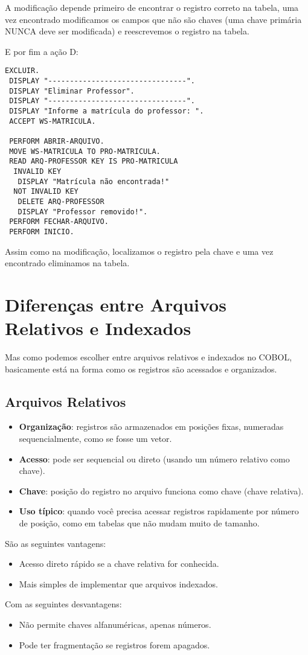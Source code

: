 A modificação depende primeiro de encontrar o registro correto na tabela, uma vez encontrado modificamos os campos que não são chaves (uma chave primária NUNCA deve ser modificada) e reescrevemos o registro na tabela.

E por fim a ação D:
\begin{lstlisting}[]
EXCLUIR.
 DISPLAY "--------------------------------".
 DISPLAY "Eliminar Professor".
 DISPLAY "--------------------------------".
 DISPLAY "Informe a matrícula do professor: ".
 ACCEPT WS-MATRICULA.

 PERFORM ABRIR-ARQUIVO.
 MOVE WS-MATRICULA TO PRO-MATRICULA.
 READ ARQ-PROFESSOR KEY IS PRO-MATRICULA
  INVALID KEY 
   DISPLAY "Matrícula não encontrada!"
  NOT INVALID KEY
   DELETE ARQ-PROFESSOR
   DISPLAY "Professor removido!".
 PERFORM FECHAR-ARQUIVO.
 PERFORM INICIO.
\end{lstlisting}

Assim como na modificação, localizamos o registro pela chave e uma vez encontrado eliminamos na tabela.

\section{Diferenças entre Arquivos Relativos e Indexados}
Mas como podemos escolher entre arquivos relativos e indexados no COBOL, basicamente está na forma como os registros são acessados e organizados.

\subsection{Arquivos Relativos}
\begin{itemize}
	\item \textbf{Organização}: registros são armazenados em posições fixas, numeradas sequencialmente, como se fosse um vetor.
	\item \textbf{Acesso}: pode ser sequencial ou direto (usando um número relativo como chave).
	\item \textbf{Chave}: posição do registro no arquivo funciona como chave (chave relativa).
	\item \textbf{Uso típico}: quando você precisa acessar registros rapidamente por número de posição, como em tabelas que não mudam muito de tamanho.
\end{itemize}
São as seguintes vantagens: \vspace{-1em}
\begin{itemize}
	\item Acesso direto rápido se a chave relativa for conhecida.
	\item Mais simples de implementar que arquivos indexados.
\end{itemize}
Com as seguintes desvantagens: \vspace{-1em}
\begin{itemize}
	\item Não permite chaves alfanuméricas, apenas números.
	\item Pode ter fragmentação se registros forem apagados.
\end{itemize}

